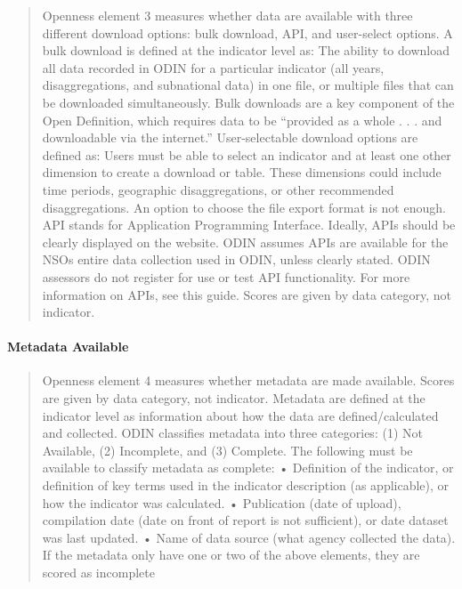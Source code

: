 \documentclass[]{article}
\let\oldparagraph\paragraph
\renewcommand{\paragraph}[1]{\oldparagraph{#1}\mbox{}}
\begin{document}
\begin{quote}
Openness element 3 measures whether data are available with three
different download options: bulk download, API, and user-select options.
A bulk download is defined at the indicator level as: The ability to
download all data recorded in ODIN for a particular indicator (all
years, disaggregations, and subnational data) in one file, or multiple
files that can be downloaded simultaneously. Bulk downloads are a key
component of the Open Definition, which requires data to be ``provided
as a whole . . . and downloadable via the internet.'' User-selectable
download options are defined as: Users must be able to select an
indicator and at least one other dimension to create a download or
table. These dimensions could include time periods, geographic
disaggregations, or other recommended disaggregations. An option to
choose the file export format is not enough. API stands for Application
Programming Interface. Ideally, APIs should be clearly displayed on the
website. ODIN assumes APIs are available for the NSOs entire data
collection used in ODIN, unless clearly stated. ODIN assessors do not
register for use or test API functionality. For more information on
APIs, see this guide. Scores are given by data category, not indicator.
\end{quote}

\hypertarget{metadata-available}{%
\paragraph{Metadata Available}\label{metadata-available}}

\begin{quote}
Openness element 4 measures whether metadata are made available. Scores
are given by data category, not indicator. Metadata are defined at the
indicator level as information about how the data are defined/calculated
and collected. ODIN classifies metadata into three categories: (1) Not
Available, (2) Incomplete, and (3) Complete. The following must be
available to classify metadata as complete: • Definition of the
indicator, or definition of key terms used in the indicator description
(as applicable), or how the indicator was calculated. • Publication
(date of upload), compilation date (date on front of report is not
sufficient), or date dataset was last updated. • Name of data source
(what agency collected the data). If the metadata only have one or two
of the above elements, they are scored as incomplete
\end{quote}
\end{document}
